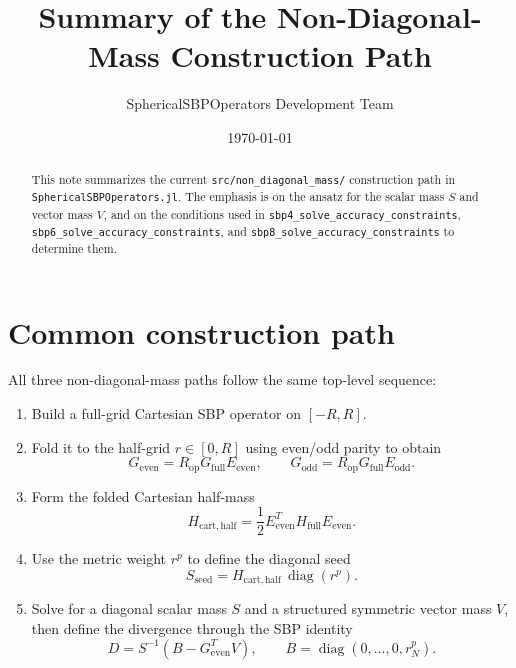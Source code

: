 \documentclass[
  aps,
  pre,
  reprint,
  superscriptaddress,
  nofootinbib
]{revtex4-2}
\newcommand{\diag}{\operatorname{diag}}
\newcommand{\Half}{\mathrm{half}}
\begin{document}
\title{Summary of the Non-Diagonal-Mass Construction Path}
\author{SphericalSBPOperators Development Team}
\date{\today}

\begin{abstract}
This note summarizes the current \texttt{src/non\_diagonal\_mass/} construction path in
\texttt{SphericalSBPOperators.jl}.
The emphasis is on the ansatz for the scalar mass $S$ and vector mass $V$, and on the
conditions used in \texttt{sbp4\_solve\_accuracy\_constraints},
\texttt{sbp6\_solve\_accuracy\_constraints}, and
\texttt{sbp8\_solve\_accuracy\_constraints} to determine them.
\end{abstract}

\maketitle

\section{Common construction path}
All three non-diagonal-mass paths follow the same top-level sequence:
\begin{enumerate}
  \item Build a full-grid Cartesian SBP operator on $[-R,R]$.
  \item Fold it to the half-grid $r \in [0,R]$ using even/odd parity to obtain
  \begin{equation}
    G_{\mathrm{even}} = R_{\mathrm{op}} G_{\mathrm{full}} E_{\mathrm{even}},
    \qquad
    G_{\mathrm{odd}} = R_{\mathrm{op}} G_{\mathrm{full}} E_{\mathrm{odd}}.
  \end{equation}
  \item Form the folded Cartesian half-mass
  \begin{equation}
    H_{\mathrm{cart},\Half}
    = \frac12 E_{\mathrm{even}}^{T} H_{\mathrm{full}} E_{\mathrm{even}}.
  \end{equation}
  \item Use the metric weight $r^p$ to define the diagonal seed
  \begin{equation}
    S_{\mathrm{seed}}
    = H_{\mathrm{cart},\Half}\,\diag(r^p).
  \end{equation}
  \item Solve for a diagonal scalar mass $S$ and a structured symmetric vector mass $V$,
  then define the divergence through the SBP identity
  \begin{equation}
    D = S^{-1}(B - G_{\mathrm{even}}^{T} V),
    \qquad
    B = \diag(0,\dots,0,r_N^p).
  \end{equation}
\end{enumerate}
\end{document}
